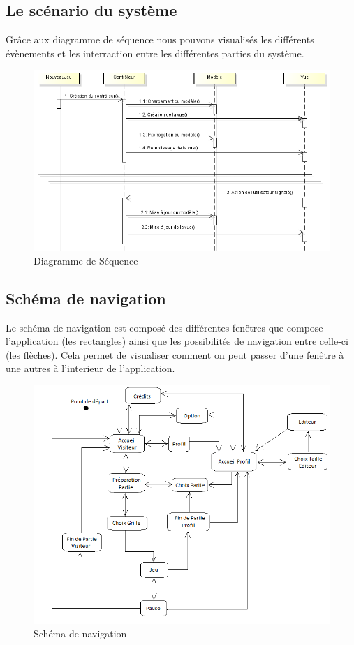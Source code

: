 \documentclass[11pt]{article}
\begin{document}
\newpage

\subsection{Le scénario du système}

Grâce aux diagramme de séquence nous pouvons visualisés les différents évènements et les interraction entre les différentes parties du système. 

	\begin{figure}[!ht]
		\centering
		\includegraphics[width=18.5cm]{./Diagrammes/DiagrammeDeSequence.png}
		\caption{Diagramme de Séquence}
	\end{figure}

\newpage

\subsection{Schéma de navigation}

Le schéma de navigation est composé des différentes fenêtres que compose l'application (les rectangles) ainsi que les possibilités de navigation entre celle-ci (les flèches). Cela permet de visualiser comment on peut passer d'une fenêtre à
une autres à l'interieur de l'application.

	\begin{figure}[!ht]
		\centering
		\includegraphics[width=18.5cm]{./Diagrammes/Schema_navigation.png}
		\caption{Schéma de navigation}
	\end{figure}
\end{document}
